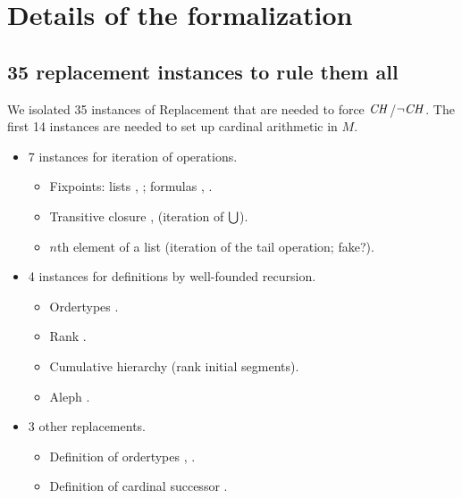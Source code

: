 \section{Details of the formalization}

\subsection{35 replacement instances to rule them all}
We isolated 35 instances of Replacement that are needed to force
$\mathit{CH}$/$\neg\mathit{CH}$. The first 14 instances are needed to set up
cardinal arithmetic in $M$.

\begin{itemize}
\item 7 instances for iteration of operations.
  \begin{itemize}
  \item Fixpoints: lists
    ,
    ; formulas
    ,
    .
  \item Transitive closure ,
     (iteration of $\mathop{\textstyle\bigcup}$).
  \item $n$th element of a list  (iteration of the tail operation; fake?).
  \end{itemize}
  
\item 4 instances for definitions by well-founded recursion.
  \begin{itemize}
  \item Ordertypes .
  \item Rank .
  \item Cumulative hierarchy  (rank initial segments).
  \item Aleph .
  \end{itemize}
  
\item 3 other replacements.
  \begin{itemize}
  \item Definition of ordertypes ,
    \isatt{}.
  \item Definition of cardinal successor .
  \end{itemize}
\end{itemize}

